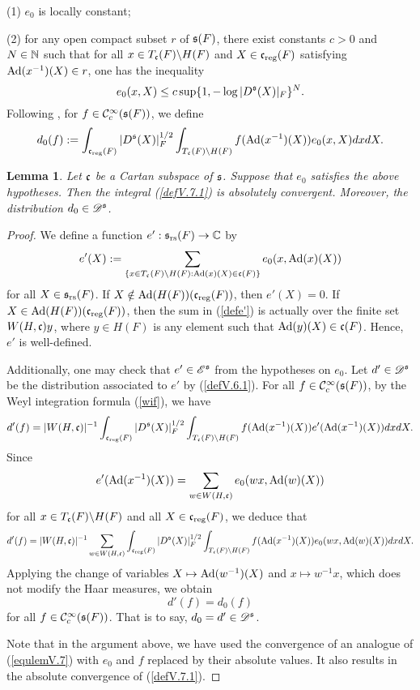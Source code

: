 \documentclass[a4paper]{amsart}
\newcommand{\mse}{\mathscr{E}}\newcommand{\msf}{\mathscr{F}}\newcommand{\msg}{\mathscr{G}}\newcommand{\msh}{\mathscr{H}}
\newtheorem{lem}[thm]{Lemma}
\theoremstyle{definition}
\theoremstyle{remark}
\numberwithin{equation}{subsection}
\begin{document}
(1) $e_0$ is locally constant; 

(2) for any open compact subset $r$ of ${\mathfrak{s}}(F)$, there exist constants $c>0$ and $N\in{\mathbb {N}}$ such that for all $x\in T_{\mathfrak{c}}(F)\backslash H(F)$ and $X\in{\mathfrak{c}}_{\mathrm{reg}}(F)$ satisfying ${\mathrm{Ad}}(x^{-1})(X)\in r$, one has the inequality
$$ e_0(x, X)\leq c\sup\{1, -\log |D^{\mathfrak{s}}(X)|_F\}^N. $$
Following \cite[\S V.7]{MR1344131}, for $f\in{\mathcal {C}}_c^\infty({\mathfrak{s}}(F))$, we define
\begin{equation}\label{defV.7.1}
 d_0(f):=\int_{{\mathfrak{c}}_{\mathrm{reg}}(F)} |D^{\mathfrak{s}}(X)|_F^{1/2} \int_{T_{\mathfrak{c}}(F)\backslash H(F)} f({\mathrm{Ad}}(x^{-1})(X)) e_0(x, X) dx dX. 
\end{equation}

\begin{lem}\label{lemV.7.1}
Let ${\mathfrak{c}}$ be a Cartan subspace of ${\mathfrak{s}}$. Suppose that $e_0$ satisfies  the above hypotheses. Then the integral (\ref{defV.7.1}) is absolutely convergent. Moreover, the distribution $d_0\in\mathscr{D}^{\mathfrak{s}}$. 
\end{lem}

\begin{proof}
We define a function $e':{\mathfrak{s}}_{\mathrm{rs}}(F)\rightarrow {\mathbb {C}}$ by
\begin{equation}\label{defe'}
 e'(X):=\sum_{\{x\in T_{\mathfrak{c}}(F)\backslash H(F):{\mathrm{Ad}}(x)(X)\in {\mathfrak{c}}(F)\}} e_0(x,{\mathrm{Ad}}(x)(X)) 
\end{equation}
for all $X\in{\mathfrak{s}}_{\mathrm{rs}}(F)$. If $X\notin{\mathrm{Ad}}(H(F))({\mathfrak{c}}_{\mathrm{reg}}(F))$, then $e'(X)=0$. If $X\in{\mathrm{Ad}}(H(F))({\mathfrak{c}}_{\mathrm{reg}}(F))$, then the sum in (\ref{defe'}) is actually over the finite set $W(H, {\mathfrak{c}})y$, where $y\in H(F)$ is any element such that ${\mathrm{Ad}}(y)(X)\in{\mathfrak{c}}(F)$. Hence, $e'$ is well-defined. 

Additionally, one may check that $e'\in\mse^\fs$ from the hypotheses on $e_0$. Let $d'\in\mathscr{D}^{\mathfrak{s}}$ be the distribution associated to $e'$ by (\ref{defV.6.1}). For all $f\in{\mathcal {C}}_c^\infty({\mathfrak{s}}(F))$, by the Weyl integration formula (\ref{wif}), we have
\begin{equation}\label{equlemV.7}
 d'(f)=|W(H, {\mathfrak{c}})|^{-1} \int_{{\mathfrak{c}}_{\mathrm{reg}}(F)} |D^{\mathfrak{s}}(X)|_F^{1/2} \int_{T_{\mathfrak{c}}(F)\backslash H(F)} f({\mathrm{Ad}}(x^{-1})(X)) e'({\mathrm{Ad}}(x^{-1})(X)) dx dX. 
\end{equation}
Since
$$ e'({\mathrm{Ad}}(x^{-1})(X))=\sum_{w\in W(H,{\mathfrak{c}})} e_0(wx,{\mathrm{Ad}}(w)(X)) $$
for all $x\in T_{\mathfrak{c}}(F)\backslash H(F)$ and all $X\in{\mathfrak{c}}_{\mathrm{reg}}(F)$, we deduce that
$$ d'(f)=|W(H, {\mathfrak{c}})|^{-1} \sum_{w\in W(H,{\mathfrak{c}})} \int_{{\mathfrak{c}}_{\mathrm{reg}}(F)} |D^{\mathfrak{s}}(X)|_F^{1/2} \int_{T_{\mathfrak{c}}(F)\backslash H(F)} f({\mathrm{Ad}}(x^{-1})(X)) e_0(wx,{\mathrm{Ad}}(w)(X)) dx dX. $$
Applying the change of variables $X\mapsto {\mathrm{Ad}}(w^{-1})(X)$ and $x\mapsto w^{-1}x$, which does not modify the Haar measures, we obtain
$$ d'(f)=d_0(f) $$
for all $f\in{\mathcal {C}}_c^\infty({\mathfrak{s}}(F))$. That is to say, $d_0=d'\in\mathscr{D}^{\mathfrak{s}}$. 

Note that in the argument above, we have used the convergence of an analogue of (\ref{equlemV.7}) with $e_0$ and $f$ replaced by their absolute values. It also results in the absolute convergence of (\ref{defV.7.1}). 
\end{proof}
\end{document}
